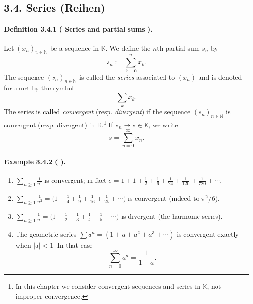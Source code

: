 \documentclass[12pt]{article}
\newcommand{\N}{\mathbb{N}}
\newcommand{\K}{\mathbb{K}} %
\newcommand{\NumberedDefinition}[3]{%
\paragraph*{Definition #1 ( #2 ).} #3\par}
\newcommand{\NumberedExample}[3]{%
\paragraph*{Example #1 ( #2 ).} #3\par}
\begin{document}
\subsection*{3.4. Series (Reihen)}

\NumberedDefinition{3.4.1}{Series and partial sums}{Let $(x_n)_{n\in\N}$ be a sequence in $\K$. We define the $n$th partial sum $s_n$ by
\[
	s_n := \sum_{k=0}^{n} x_k.
\]
The sequence $(s_n)_{n\in\N}$ is called the \emph{series} associated to $(x_n)$ and is denoted for short by the symbol
\[
	\sum_{k} x_k.
\]
The series is called \emph{convergent} (resp. \emph{divergent}) if the sequence $(s_n)_{n\in\N}$ is convergent (resp. divergent) in $\K$.\footnote{In this chapter we consider convergent sequences and series in $\K$, not improper convergence.}
If $s_n \to s\in\K$, we write
\[
	s = \sum_{n=0}^{\infty} x_n.
\]}

\NumberedExample{3.4.2}{}{\begin{enumerate}[label={(\arabic*)}, leftmargin=*]
	\item $\displaystyle \sum_{n\ge 1} \frac{1}{n!}$ is convergent; in fact $e = 1 + 1 + \tfrac12 + \tfrac16 + \tfrac{1}{24} + \tfrac{1}{120} + \tfrac{1}{720} + \cdots$.

	\item $\displaystyle \sum_{n\ge 1} \frac{1}{n^2} = \Big(1 + \tfrac{1}{4} + \tfrac{1}{9} + \tfrac{1}{16} + \tfrac{1}{25} + \cdots\Big)$ is convergent (indeed to $\pi^2/6$).

	\item $\displaystyle \sum_{n\ge 1} \frac{1}{n} = \big(1 + \tfrac{1}{2} + \tfrac{1}{3} + \tfrac{1}{4} + \tfrac{1}{5} + \cdots\big)$ is divergent (the harmonic series).

	\item The geometric series $\sum a^n = (1 + a + a^2 + a^3 + \cdots)$ is convergent exactly when $|a|<1$. In that case
	\[
		\sum_{n=0}^{\infty} a^n = \frac{1}{1-a}.
	\]
\end{enumerate}}
\end{document}
